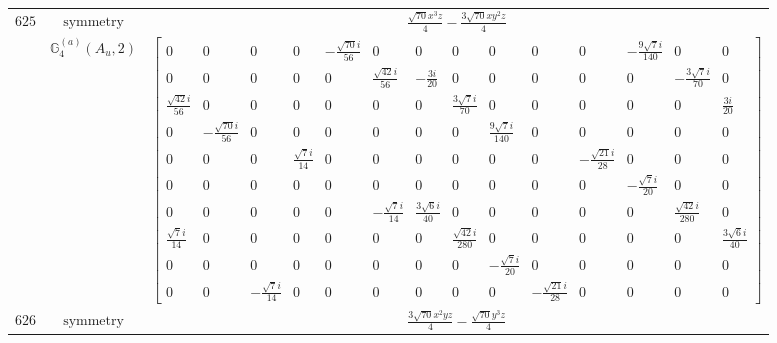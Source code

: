 \documentclass[fleqn,8pt,landscape]{jsarticle}
\begin{document}
\begin{longtable}{ccc}
$ 625 $ & $ \text{symmetry} $ & $ \frac{\sqrt{70} x^{3} z}{4} - \frac{3 \sqrt{70} x y^{2} z}{4} $ \\
$  $ & $ \mathbb{G}_{4}^{(a)}(A_{u},2) $ & $ \begin{bmatrix} 0 & 0 & 0 & 0 & - \frac{\sqrt{70} i}{56} & 0 & 0 & 0 & 0 & 0 & 0 & - \frac{9 \sqrt{7} i}{140} & 0 & 0 \\ 0 & 0 & 0 & 0 & 0 & \frac{\sqrt{42} i}{56} & - \frac{3 i}{20} & 0 & 0 & 0 & 0 & 0 & - \frac{3 \sqrt{7} i}{70} & 0 \\ \frac{\sqrt{42} i}{56} & 0 & 0 & 0 & 0 & 0 & 0 & \frac{3 \sqrt{7} i}{70} & 0 & 0 & 0 & 0 & 0 & \frac{3 i}{20} \\ 0 & - \frac{\sqrt{70} i}{56} & 0 & 0 & 0 & 0 & 0 & 0 & \frac{9 \sqrt{7} i}{140} & 0 & 0 & 0 & 0 & 0 \\ 0 & 0 & 0 & \frac{\sqrt{7} i}{14} & 0 & 0 & 0 & 0 & 0 & 0 & - \frac{\sqrt{21} i}{28} & 0 & 0 & 0 \\ 0 & 0 & 0 & 0 & 0 & 0 & 0 & 0 & 0 & 0 & 0 & - \frac{\sqrt{7} i}{20} & 0 & 0 \\ 0 & 0 & 0 & 0 & 0 & - \frac{\sqrt{7} i}{14} & \frac{3 \sqrt{6} i}{40} & 0 & 0 & 0 & 0 & 0 & \frac{\sqrt{42} i}{280} & 0 \\ \frac{\sqrt{7} i}{14} & 0 & 0 & 0 & 0 & 0 & 0 & \frac{\sqrt{42} i}{280} & 0 & 0 & 0 & 0 & 0 & \frac{3 \sqrt{6} i}{40} \\ 0 & 0 & 0 & 0 & 0 & 0 & 0 & 0 & - \frac{\sqrt{7} i}{20} & 0 & 0 & 0 & 0 & 0 \\ 0 & 0 & - \frac{\sqrt{7} i}{14} & 0 & 0 & 0 & 0 & 0 & 0 & - \frac{\sqrt{21} i}{28} & 0 & 0 & 0 & 0 \end{bmatrix} $ \\ \hline
$ 626 $ & $ \text{symmetry} $ & $ \frac{3 \sqrt{70} x^{2} y z}{4} - \frac{\sqrt{70} y^{3} z}{4} $ \\

\end{longtable}
\end{document}
